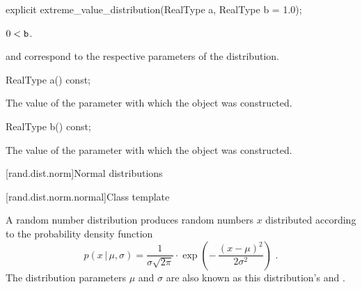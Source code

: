 %
\begin{itemdecl}
explicit extreme_value_distribution(RealType a, RealType b = 1.0);
\end{itemdecl}

\begin{itemdescr}
\pnum
\expects
$0 < \texttt{\protect b}$.

\pnum
\remarks
{} and 
correspond to the respective parameters of the distribution.
\end{itemdescr}

%
\begin{itemdecl}
RealType a() const;
\end{itemdecl}

\begin{itemdescr}
\pnum
\returns
The value of the  parameter
 with which the object was constructed.
\end{itemdescr}

%
\begin{itemdecl}
RealType b() const;
\end{itemdecl}

\begin{itemdescr}
\pnum
\returns
The value of the  parameter
 with which the object was constructed.
\end{itemdescr}%
%



[rand.dist.norm]{Normal distributions}%
%


[rand.dist.norm.normal]{Class template }%
%

\pnum
A  random number distribution
produces random numbers $x$
distributed according to
the probability density function%
\[%
 p(x\,|\,\mu,\sigma)
      = \frac{1}{\sigma \sqrt{2\pi}}
        \cdot
        \exp{\left(- \, \frac{(x - \mu)^2}
                             {2 \sigma^2}
             \right)
            }
 \text{ .}
\]
The distribution parameters $\mu$ and $\sigma$
are also known as this distribution's 
and .


